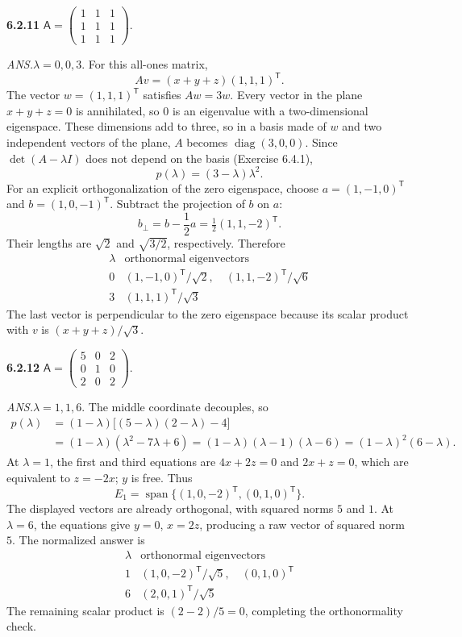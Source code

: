 \par\bigskip
\noindent\textbf{6.2.11}\quad
$\mathsf{A}=\begin{pmatrix}1&1&1\\1&1&1\\1&1&1\end{pmatrix}$.
\par\nobreak\hfill\emph{ANS.}\enspace $\lambda=0,0,3$.
\solution
For this all-ones matrix,
\[
Av=(x+y+z)(1,1,1)^{\mathsf T}.
\]
The vector $w=(1,1,1)^{\mathsf T}$ satisfies $Aw=3w$.
Every vector in the plane $x+y+z=0$ is annihilated, so $0$ is an
eigenvalue with a two-dimensional eigenspace. These dimensions add to
three, so in a basis made of $w$ and two independent vectors of the
plane, $A$ becomes $\operatorname{diag}(3,0,0)$. Since $\det(A-\lambda I)$ does
not depend on the basis (Exercise 6.4.1),
\[
p(\lambda)=(3-\lambda)\lambda^2.
\]
For an explicit orthogonalization of the zero eigenspace, choose
$a=(1,-1,0)^{\mathsf T}$ and $b=(1,0,-1)^{\mathsf T}$.
Subtract the projection of $b$ on $a$:
\[
b_\perp=b-\frac{1}{2}a=\tfrac12(1,1,-2)^{\mathsf T}.
\]
Their lengths are $\sqrt2$ and $\sqrt{3/2}$, respectively. Therefore
\[
\boxed{\begin{array}{c|c}
\lambda&\text{orthonormal eigenvectors}\\\hline
0&(1,-1,0)^{\mathsf T}/\sqrt2,\quad(1,1,-2)^{\mathsf T}/\sqrt6\\
3&(1,1,1)^{\mathsf T}/\sqrt3
\end{array}}
\]
The last vector is perpendicular to the zero eigenspace because its
scalar product with $v$ is $(x+y+z)/\sqrt3$.

\par\bigskip
\noindent\textbf{6.2.12}\quad
$\mathsf{A}=\begin{pmatrix}5&0&2\\0&1&0\\2&0&2\end{pmatrix}$.
\par\nobreak\hfill\emph{ANS.}\enspace $\lambda=1,1,6$.
\solution
The middle coordinate decouples, so
\begin{align*}
p(\lambda)
&=(1-\lambda)\bigl[(5-\lambda)(2-\lambda)-4\bigr]\\
&=(1-\lambda)(\lambda^2-7\lambda+6)
=(1-\lambda)(\lambda-1)(\lambda-6)
=(1-\lambda)^2(6-\lambda).
\end{align*}
At $\lambda=1$, the first and third equations are $4x+2z=0$ and
$2x+z=0$, which are equivalent to $z=-2x$; $y$ is free. Thus
\[
E_1=\operatorname{span}\{(1,0,-2)^{\mathsf T},(0,1,0)^{\mathsf T}\}.
\]
The displayed vectors are already orthogonal, with squared norms $5$
and $1$. At $\lambda=6$, the equations give $y=0$, $x=2z$, producing
a raw vector of squared norm $5$. The normalized answer is
\[
\boxed{\begin{array}{c|c}
\lambda&\text{orthonormal eigenvectors}\\\hline
1&(1,0,-2)^{\mathsf T}/\sqrt5,\quad(0,1,0)^{\mathsf T}\\
6&(2,0,1)^{\mathsf T}/\sqrt5
\end{array}}
\]
The remaining scalar product is $(2-2)/5=0$, completing the
orthonormality check.

